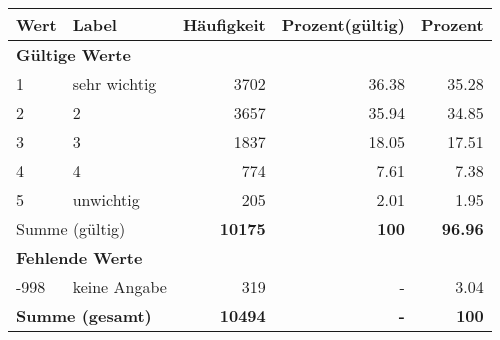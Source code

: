      \begin{longtable}{lXrrr}
     \toprule
     \textbf{Wert} & \textbf{Label} & \textbf{Häufigkeit} & \textbf{Prozent(gültig)} & \textbf{Prozent} \\
     \endhead
     \midrule
     \multicolumn{5}{l}{\textbf{Gültige Werte}}\\

     1 &
     \multicolumn{1}{X}{ sehr wichtig   } &


       \num{3702} &
       \num[round-mode=places,round-precision=2]{36.38} &
         \num[round-mode=places,round-precision=2]{35.28} \\

     2 &
     \multicolumn{1}{X}{ 2   } &


       \num{3657} &
       \num[round-mode=places,round-precision=2]{35.94} &
         \num[round-mode=places,round-precision=2]{34.85} \\

     3 &
     \multicolumn{1}{X}{ 3   } &


       \num{1837} &
       \num[round-mode=places,round-precision=2]{18.05} &
         \num[round-mode=places,round-precision=2]{17.51} \\

     4 &
     \multicolumn{1}{X}{ 4   } &


       \num{774} &
       \num[round-mode=places,round-precision=2]{7.61} &
         \num[round-mode=places,round-precision=2]{7.38} \\

     5 &
     \multicolumn{1}{X}{ unwichtig   } &


       \num{205} &
       \num[round-mode=places,round-precision=2]{2.01} &
         \num[round-mode=places,round-precision=2]{1.95} \\
     \midrule
     \multicolumn{2}{l}{Summe (gültig)} &
       \textbf{\num{10175}} &
     \textbf{\num{100}} &
       \textbf{\num[round-mode=places,round-precision=2]{96.96}} \\
     \multicolumn{5}{l}{\textbf{Fehlende Werte}}\\
       -998 &
       keine Angabe &
         \num{319} &
        - &
         \num[round-mode=places,round-precision=2]{3.04} \\
     \midrule
     \multicolumn{2}{l}{\textbf{Summe (gesamt)}} &
          \textbf{\num{10494}} &
        \textbf{-} &
        \textbf{\num{100}} \\
     \bottomrule
     \end{longtable}
     
